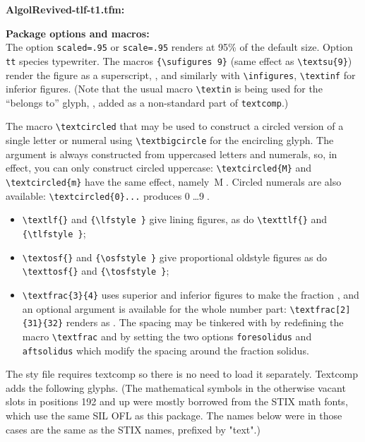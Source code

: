 \documentclass[11pt]{article}
\begin{document}
\newpage
\textbf{AlgolRevived-tlf-t1.tfm:}

\newpage
\textbf{Package options and macros:}\\
 The option \texttt{scaled=.95} or \texttt{scale=.95} renders at 95\% of the default size. Option \texttt{tt} species typewriter. The macros \verb|{\sufigures 9}| (same effect as \verb|\textsu{9}|) render the figure as a superscript, , and similarly with \verb|\infigures|, \verb|\textinf| for inferior figures. (Note that the usual macro \verb|\textin| is being used for the ``belongs to''  glyph, \textin, added as a non-standard part of {\tt textcomp}.)

The macro \verb|\textcircled| that may be used to construct a circled version of a single letter or numeral using \verb|\textbigcircle| for the encircling glyph. The argument is always constructed from uppercased letters and numerals, so, in effect, you can only construct circled uppercase: \verb|\textcircled{M}| and \verb|\textcircled{m}| have the same effect, namely~\textcircled{M}. Circled numerals are also available: \verb|\textcircled{0}...| produces \textcircled{0}\dots\textcircled{9}.
\begin{itemize}
\item
\verb|\textlf{}| and \verb|{\lfstyle }| give lining figures, as do 
\verb|\texttlf{}| and \verb|{\tlfstyle }|;
\item
\verb|\textosf{}| and \verb|{\osfstyle }| give proportional oldstyle figures as do 
\verb|\texttosf{}| and \verb|{\tosfstyle }|;
\item \verb|\textfrac{3}{4}| uses superior and inferior figures to make the fraction , and an optional argument is available for the whole number part: \verb|\textfrac[2]{31}{32}| renders as . The spacing may be tinkered with by redefining the macro \verb|\textfrac| and by setting the two options {\tt foresolidus} and {\tt aftsolidus} which modify the spacing around the fraction solidus.
\end{itemize}


The sty file requires textcomp so there is no need to load it separately. Textcomp adds the following glyphs. (The mathematical symbols in the otherwise vacant slots in positions 192 and up were mostly borrowed from the STIX math fonts, which use the same SIL OFL as this package. The names below were in those cases are the same as the STIX names, prefixed by "text".)
\newpage
\end{document}
